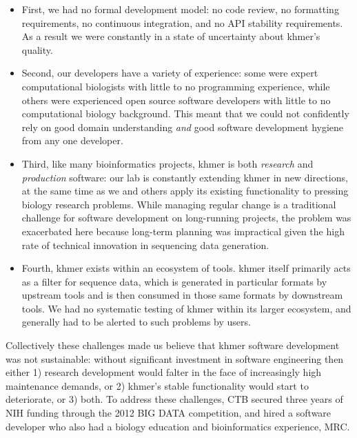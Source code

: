 \documentclass[12pt]{article}
\begin{document}
\begin{itemize}
\item First, we had no formal development model: no code review, no
  formatting requirements, no continuous integration, and no API
  stability requirements.  As a result we were constantly in a
  state of uncertainty about khmer's quality.

\item Second, our developers have a variety of experience: some were
  expert computational biologists with little to no programming
  experience, while others were experienced open source software
  developers with little to no computational biology background.  This
  meant that we could not confidently rely on good domain
  understanding {\em and} good software development hygiene from any
  one developer.

\item Third, like many bioinformatics projects, khmer is both {\em
  research} and {\em production} software: our lab is constantly
  extending khmer in new directions, at the same time as we and others
  apply its existing functionality to pressing biology research
  problems.  While managing regular change is a traditional challenge
  for software development on long-running projects, the problem was
  exacerbated here because long-term planning was impractical given
  the high rate of technical innovation in sequencing data generation.

\item Fourth, khmer exists within an ecosystem of tools.  khmer itself
  primarily acts as a filter for sequence data, which is generated in
  particular formats by upstream tools and is then consumed in those
  same formats by downstream tools.  We had no systematic testing of
  khmer within its larger ecosystem, and generally had to be alerted
  to such problems by users.

\end{itemize}

Collectively these challenges made us believe that khmer software
development was not sustainable: without significant investment in
software engineering then either 1) research development would falter in the
face of increasingly high maintenance demands, or 2) khmer's stable
functionality would start to deteriorate, or 3) both.  To address these
challenges, CTB secured three years of NIH funding through the 2012
BIG DATA competition, and hired a software developer who also had a biology
education and bioinformatics experience, MRC.
\end{document}
